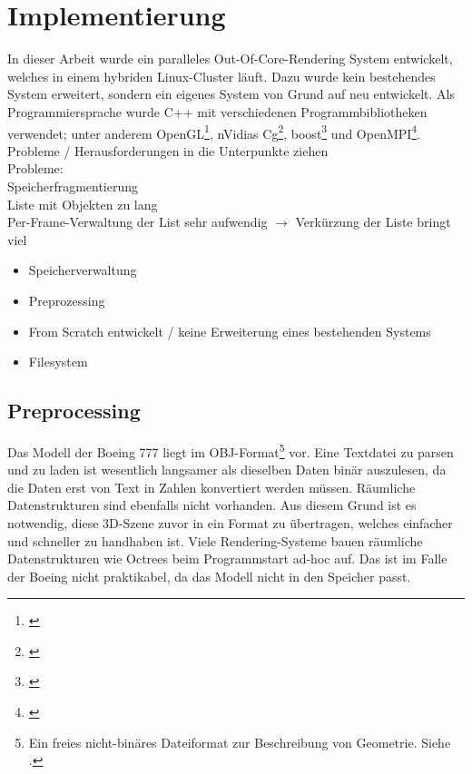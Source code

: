 
\chapter{Implementierung}
\label{chap:impl}

In dieser Arbeit wurde ein paralleles Out-Of-Core-Rendering System entwickelt, welches in einem hybriden Linux-Cluster läuft. Dazu wurde kein bestehendes System erweitert, sondern ein eigenes System von Grund auf neu entwickelt. Als Programmiersprache wurde C++ mit verschiedenen Programmbibliotheken verwendet; unter anderem OpenGL\footnote{\cite{opengl}}, nVidias Cg\footnote{\cite{cg}}, boost\footnote{\cite{boost}} und OpenMPI\footnote{\cite{mpi}}. \\
Probleme / Herausforderungen in die Unterpunkte ziehen\\
Probleme:\\
Speicherfragmentierung\\
Liste mit Objekten zu lang\\
Per-Frame-Verwaltung der List sehr aufwendig $\rightarrow$ Verkürzung der Liste bringt viel
\begin{itemize}
 \item Speicherverwaltung
 \item Preprozessing
 \item From Scratch entwickelt / keine Erweiterung eines bestehenden Systems
 \item Filesystem
\end{itemize}

\section{Preprocessing}
\label{sec:impl:preprocessing}
Das Modell der Boeing 777 liegt im OBJ-Format\footnote{Ein freies nicht-binäres Dateiformat zur Beschreibung von Geometrie. Siehe \cite{obj}. } vor. Eine Textdatei zu parsen und zu laden ist wesentlich langsamer als dieselben Daten binär auszulesen, da die Daten erst von Text in Zahlen konvertiert werden müssen. Räumliche Datenstrukturen sind ebenfalls nicht vorhanden. Aus diesem Grund ist es notwendig, diese 3D-Szene zuvor in ein Format zu übertragen, welches einfacher und schneller zu handhaben ist. Viele Rendering-Systeme bauen räumliche Datenstrukturen wie Octrees beim Programmstart ad-hoc auf. Das ist im Falle der Boeing nicht praktikabel, da das Modell nicht in den Speicher passt.

